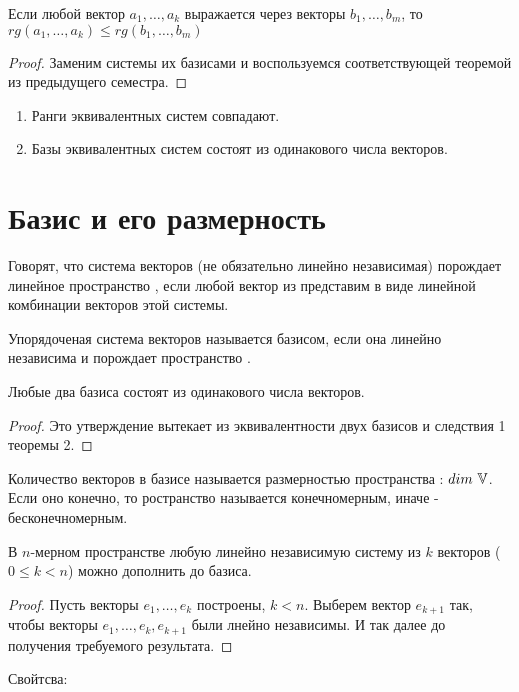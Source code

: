\begin{theor}
Если любой вектор $a_1,\ldots,a_k$ выражается через векторы $b_1,\ldots,b_m$, то $rg(a_1,\ldots,a_k)\leq rg(b_1,\ldots,b_m)$
\end{theor}
\begin{proof}
Заменим системы их базисами и воспользуемся соответствующей теоремой из предыдущего семестра.
\end{proof}
\begin{effect}
\begin{enumerate}
\item Ранги эквивалентных систем совпадают.
\item Базы эквивалентных систем состоят из одинакового числа векторов.
\end{enumerate}
\end{effect}
\section{Базис и его размерность}
\begin{opred}
Говорят, что система векторов (не обязательно линейно независимая) порождает линейное пространство \V, если любой вектор из \V представим в виде линейной комбинации векторов этой системы.
\end{opred}
\begin{opred}
Упорядоченая система векторов называется базисом, если она линейно независима и порождает пространство \V.
\end{opred}
\begin{theor}
Любые два базиса состоят из одинакового числа векторов.
\end{theor}
\begin{proof}
Это утверждение вытекает из эквивалентности двух базисов и следствия 1 теоремы 2.
\end{proof}
\begin{opred}
Количество векторов в базисе называется размерностью пространства \V: $dim\ \mathbb{V}$. Если оно конечно, то ространство называется конечномерным, иначе - бесконечномерным.
\end{opred}
\begin{theor}
В $n$-мерном пространстве любую линейно независимую систему из $k$ векторов ($0\leq k<n$) можно дополнить до базиса.
\end{theor}
\begin{proof}
Пусть векторы $e_1,\ldots,e_k$ построены, $k<n$. Выберем вектор $e_{k+1}$ так, чтобы векторы $e_1,\ldots,e_k,e_{k+1}$ были лнейно независимы. И так далее до получения требуемого результата.
\end{proof}
Свойтсва:

